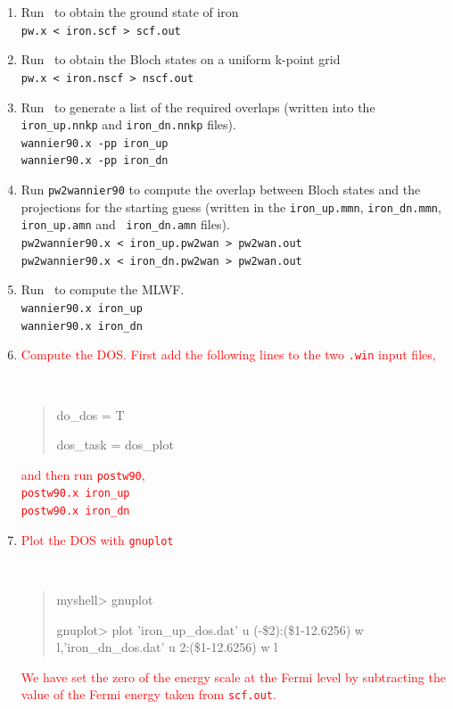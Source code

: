 \documentclass[a4paper,11pt,twoside]{article}
\def\tent#1{\textcolor{red}{#1}}     %
\begin{document}
\begin{enumerate}
\item Run \pwscf\ to obtain the ground state of iron\\
{\tt pw.x < iron.scf > scf.out}

\item Run \pwscf\ to obtain the Bloch states on a uniform k-point grid\\
{\tt pw.x < iron.nscf > nscf.out}

\item Run \wannier\ to generate a list of the required overlaps (written
  into the {\tt iron\_up.nnkp} and {\tt iron\_dn.nnkp} files).\\
{\tt wannier90.x -pp iron\_up}\\
{\tt wannier90.x -pp iron\_dn}

\item Run {\tt pw2wannier90} to compute the overlap between Bloch
  states and the projections for the starting guess (written in the
  {\tt iron\_up.mmn}, {\tt iron\_dn.mmn}, {\tt iron\_up.amn} and {\tt
  iron\_dn.amn} files).\\ 
{\tt pw2wannier90.x < iron\_up.pw2wan > pw2wan.out}\\
{\tt pw2wannier90.x < iron\_dn.pw2wan > pw2wan.out}

\item Run \wannier\ to compute the MLWF.\\
{\tt wannier90.x iron\_up}\\
{\tt wannier90.x iron\_dn}

\item \tent{Compute the DOS. First add the following
lines to the two {\tt .win} input files,}
{\tt
\begin{quote}
do\_dos = T

dos\_task = dos\_plot
\end{quote}
}

\tent{and then run {\tt postw90},\\
{\tt postw90.x iron\_up}\\
{\tt postw90.x iron\_dn}
}

\item \tent{Plot the DOS with {\tt gnuplot}}
{\tt
\begin{quote}
myshell> gnuplot

gnuplot> plot 'iron\_up\_dos.dat' u (-\$2):(\$1-12.6256) w l,'iron\_dn\_dos.dat' u 2:(\$1-12.6256) w l

\end{quote} 
}

\tent{We have set the zero of the energy scale at the Fermi level by
  subtracting %
the value of the Fermi energy taken from
  {\tt scf.out}. 
}

\end{enumerate}
\end{document}
